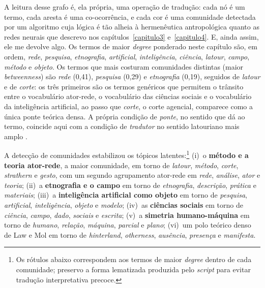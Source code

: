 A leitura desse grafo é, ela própria, uma operação de tradução: cada
nó é um termo, cada aresta é uma co-ocorrência, e cada cor é uma
comunidade detectada por um algoritmo cuja lógica é tão alheia à
hermenêutica antropológica quanto as redes neurais que descrevo nos
capítulos~\ref{capitulo3} e~\ref{capitulo4}. E, ainda assim, ele me
devolve algo. Os termos de maior \textit{degree} ponderado neste
capítulo são, em ordem, \textit{rede}, \textit{pesquisa},
\textit{etnografia}, \textit{artificial}, \textit{inteligência},
\textit{ciência}, \textit{latour}, \textit{campo}, \textit{método} e
\textit{objeto}. Os termos que mais costuram comunidades distintas
(maior \textit{betweenness}) são \textit{rede} (0,41), \textit{pesquisa}
(0,29) e \textit{etnografia} (0,19), seguidos de \textit{latour} e de
\textit{corte}: os três primeiros são os termos genéricos que permitem o
trânsito entre o vocabulário ator-rede, o vocabulário das ciências
sociais e o vocabulário da inteligência artificial, ao passo que
\textit{corte}, o corte agencial, comparece como a única ponte teórica
densa. A própria condição de \textit{ponte}, no sentido que
\textcite{Latour1986Visualization} dá ao termo, coincide aqui com a
condição de \textit{tradutor} no sentido latouriano mais amplo
\parencite{Latour2011CienciaEmAcao}.

A detecção de comunidades estabilizou os tópicos
latentes:\footnote{Os rótulos abaixo correspondem aos termos de maior
\textit{degree} dentro de cada comunidade; preservo a forma lematizada
produzida pelo \textit{script} para evitar tradução interpretativa
precoce.}
(i)~o \textbf{método e a teoria ator-rede}, a maior comunidade, em torno
de \textit{latour}, \textit{método}, \textit{corte}, \textit{strathern}
e \textit{gesto}, com um segundo agrupamento ator-rede em \textit{rede},
\textit{análise}, \textit{ator} e \textit{teoria};
(ii)~a \textbf{etnografia e o campo} em torno de \textit{etnografia},
\textit{descrição}, \textit{prática} e \textit{materiais};
(iii)~a \textbf{inteligência artificial como objeto} em torno de
\textit{pesquisa}, \textit{artificial}, \textit{inteligência},
\textit{objeto} e \textit{modelo};
(iv)~as \textbf{ciências sociais} em torno de \textit{ciência},
\textit{campo}, \textit{dado}, \textit{sociais} e \textit{escrita};
(v)~a \textbf{simetria humano-máquina} em torno de \textit{humano},
\textit{relação}, \textit{máquina}, \textit{parcial} e \textit{plano};
(vi)~um polo teórico denso de Law e Mol em torno de \textit{hinterland},
\textit{otherness}, \textit{ausência}, \textit{presença} e
\textit{manifesta}.

